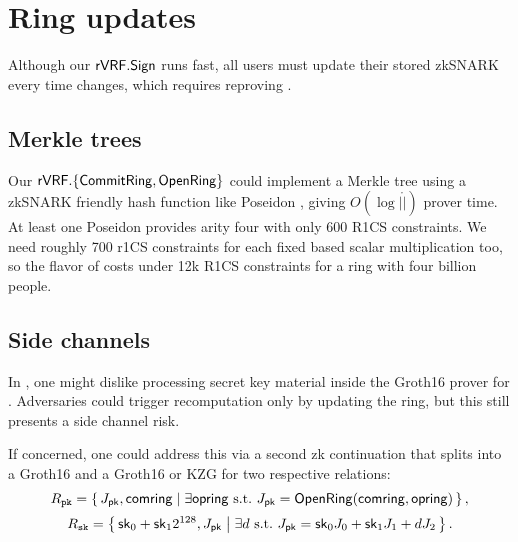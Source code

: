 \section{Ring updates}
\label{sec:ring_updates}


Although our ${\mathsf{rVRF}}.{\mathsf{Sign}}$ runs fast, all users must update their
stored zkSNARK \pifast every time \ring changes, which requires reproving \OpenRing.


\subsection{Merkle trees} %

Our ${\mathsf{rVRF}}.\{ {\mathsf{CommitRing}}, {\mathsf{OpenRing}} \}$ could implement a Merkle tree
using a zkSNARK friendly hash function like Poseidon \cite{poseidon},
giving $O(\log |\ring|)$ prover time.
%
At least one Poseidon \cite{poseidon} provides arity four with only
600 R1CS constraints.  We need roughly 700 r1CS constraints for each
fixed based scalar multiplication too, so the flavor of \pifast costs
under 12k R1CS constraints for a ring with four billion people.



\subsection{Side channels}
\label{subsec:rvrf_side_channel}

In \pifast, one might dislike processing secret key material inside
the Groth16 prover for \pifast.
Adversaries could trigger \pifast recomputation only by updating the ring,
but this still presents a side channel risk.

If concerned, one could address this via a second zk continuation that
splits \pifast into a Groth16 \pisk and a Groth16 or KZG \pipk for two
respective relations:
%
$$ \Rpk = \Setst{ J_\pk, \comring }{
	\exists \openring \textrm{\ s.t.\ }
	J_\pk = \eprint{\rVRF.}{}\OpenRing(\comring,\openring)
} \mathcomma \eprint{\quad\textrm{and}}{} $$ 
%
$$ \Rsk = \Setst{ \sk_0 + \sk_1 2^{128}, J_\pk }{ 
	\exists d \textrm{\ s.t.\ }
	J_\pk = \sk_0 \genJ_0 + \sk_1 \genJ_1 + d \genJ_2
} \mathperiod $$

